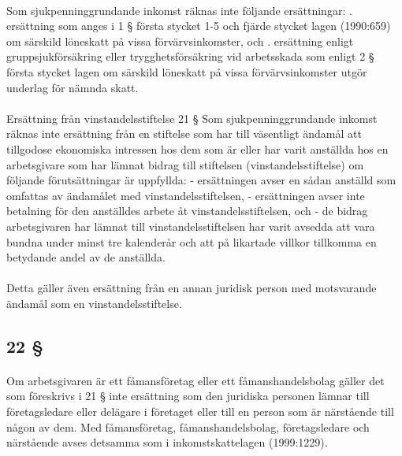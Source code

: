 \documentclass[a4paper,notitlepage,openany,10pt]{book}
\begin{document}
\paragraph*{}
Som sjukpenninggrundande inkomst räknas inte följande ersättningar:
. ersättning som anges i 1 § första stycket 1-5 och fjärde stycket lagen (1990:659) om särskild löneskatt på vissa förvärvsinkomster, och
. ersättning enligt gruppsjukförsäkring eller trygghetsförsäkring vid arbetsskada som enligt 2 § första stycket lagen om särskild löneskatt på vissa förvärvsinkomster utgör underlag för nämnda skatt.
\paragraph*{}
Ersättning från vinstandelsstiftelse 21 § Som sjukpenninggrundande inkomst räknas inte ersättning från en stiftelse som har till väsentligt ändamål att tillgodose ekonomiska intressen hos dem som är eller har varit anställda hos en arbetsgivare som har lämnat bidrag till stiftelsen (vinstandelsstiftelse) om följande förutsättningar är uppfyllda: - ersättningen avser en sådan anställd som omfattas av ändamålet med vinstandelsstiftelsen,
\newline - ersättningen avser inte betalning för den anställdes arbete åt vinstandelsstiftelsen, och
\newline - de bidrag arbetsgivaren har lämnat till vinstandelsstiftelsen har varit avsedda att vara bundna under minst tre kalenderår och att på likartade villkor tillkomma en betydande andel av de anställda.
\paragraph*{}
Detta gäller även ersättning från en annan juridisk person med motsvarande ändamål som en vinstandelsstiftelse.
\subsection*{22 §}
\paragraph*{}
Om arbetsgivaren är ett fåmansföretag eller ett fåmanshandelsbolag gäller det som föreskrivs i 21 § inte ersättning som den juridiska personen lämnar till företagsledare eller delägare i företaget eller till en person som är närstående till någon av dem.
Med fåmansföretag, fåmanshandelsbolag, företagsledare och närstående avses detsamma som i inkomstskattelagen (1999:1229).
\end{document}
